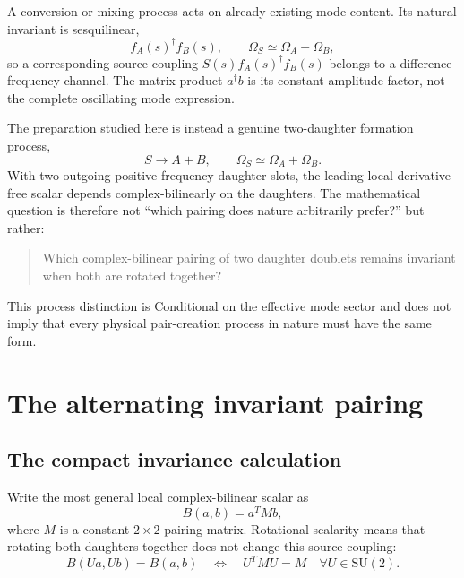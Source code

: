 \documentclass[11pt]{article}
\theoremstyle{remark}
\newcommand{\SU}{\mathrm{SU}(2)}
\begin{document}
A conversion or mixing process acts on already existing mode content.  Its natural invariant is
sesquilinear,
\begin{equation}
  f_A(s)^\dagger f_B(s),
  \qquad
  \Omega_S\simeq\Omega_A-\Omega_B,
  \label{eq:conversion_channel}
\end{equation}
so a corresponding source coupling \(S(s)f_A(s)^\dagger f_B(s)\) belongs to a
difference-frequency channel.  The matrix product \(a^\dagger b\) is its constant-amplitude
factor, not the complete oscillating mode expression.

The preparation studied here is instead a genuine two-daughter formation process,
\begin{equation}
  S\longrightarrow A+B,
  \qquad
  \Omega_S\simeq\Omega_A+\Omega_B.
  \label{eq:formation_channel}
\end{equation}
With two outgoing positive-frequency daughter slots, the leading local derivative-free scalar
depends complex-bilinearly on the daughters.  The mathematical question is therefore not ``which
pairing does nature arbitrarily prefer?'' but rather:
\begin{quote}
Which complex-bilinear pairing of two daughter doublets remains invariant when both are rotated
together?
\end{quote}
This process distinction is Conditional on the effective mode sector and does not imply that every
physical pair-creation process in nature must have the same form.

\section{The alternating invariant pairing}
\label{sec:pairing}

\subsection{The compact invariance calculation}

Write the most general local complex-bilinear scalar as
\begin{equation}
  B(a,b)=a^T M b,
  \label{eq:general_bilinear}
\end{equation}
where \(M\) is a constant \(2\times2\) pairing matrix.  Rotational scalarity means that rotating both
daughters together does not change this source coupling:
\begin{equation}
  B(Ua,Ub)=B(a,b)
  \quad\Longleftrightarrow\quad
  \boxed{U^T M U=M\quad\forall U\in\SU.}
  \label{eq:invariance}
\end{equation}
\end{document}
